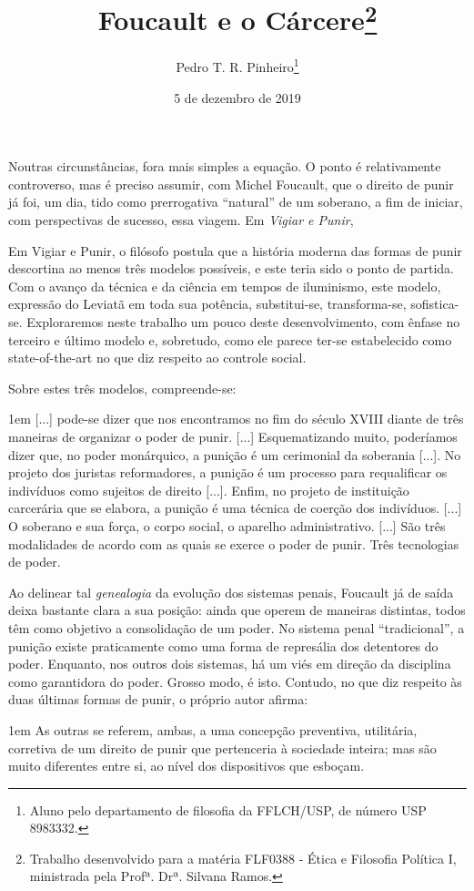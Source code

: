 \documentclass[12pt,a4paper]{article}
\author{Pedro T. R. Pinheiro\footnote{Aluno pelo departamento de filosofia 
da FFLCH/USP, de número USP 8983332. }}
\title{Foucault e o Cárcere\footnote{
	Trabalho desenvolvido para a matéria FLF0388 - Ética e Filosofia 
	Política I, ministrada pela Profª. Drª. Silvana Ramos. }}
\date{5 de dezembro de 2019}
\newenvironment{citac}
{
	\begin{addmargin}
		[4cm]{1em} \footnotesize}{\normalfont 
	\end{addmargin}
}
\begin{document}
	\maketitle
	
	\onehalfspacing
	\setlength{\parskip}{0.5cm}
	
	Noutras circunstâncias, fora mais simples a equação. O ponto é 
	relativamente controverso, mas é preciso assumir, com Michel 
	Foucault, que o direito de punir já foi, um dia, tido como 
	prerrogativa “natural” de um soberano, a fim de iniciar, com 
	perspectivas de sucesso, essa viagem. Em \textit{Vigiar e Punir}, 

	Em Vigiar e Punir, o filósofo postula que a história moderna 
	das formas de punir descortina ao menos três modelos possíveis, 
	e este teria sido o ponto de partida. Com o avanço da técnica e 
	da ciência em tempos de iluminismo, este modelo, expressão do 
	Leviatã em toda sua potência, substitui-se, transforma-se, 
	sofistica-se. Exploraremos neste trabalho um pouco deste desenvolvimento, 
	com ênfase no terceiro e último modelo e, sobretudo, como ele parece 
	ter-se estabelecido como state-of-the-art no que diz respeito ao 
	controle social.
	
	Sobre estes três modelos, compreende-se: 
	
	\begin{citac}
		[...] pode-se dizer que nos encontramos no fim do século XVIII 
		diante de três maneiras de organizar o poder de punir. [...] 
		Esquematizando muito, poderíamos dizer que, no poder 
		monárquico, a punição é um cerimonial da soberania [...]. No 
		projeto dos juristas reformadores, a punição é um processo 
		para requalificar os indivíduos como sujeitos de direito 
		[...]. Enfim, no projeto de instituição carcerária que se 
		elabora, a punição é uma técnica de coerção dos indivíduos. 
		[...] O soberano e sua força, o corpo social, o aparelho 
		administrativo. [...] São três modalidades de acordo com 
		as quais se exerce o poder de punir. Três tecnologias de poder. 
		\cite{foucault}
	\end{citac}

	Ao delinear tal \emph{genealogia} da evolução dos sistemas penais, 
	Foucault já de saída deixa bastante clara a sua posição: ainda que 
	operem de maneiras distintas, todos têm como objetivo a consolidação 
	de um poder. No sistema penal ``tradicional'', a punição existe 
	praticamente como uma forma de represália dos detentores do poder. 
	Enquanto, nos outros dois sistemas, há um viés em direção da 
	disciplina como garantidora do poder. Grosso modo, é isto. Contudo, 
	no que diz respeito às duas últimas formas de punir, o 
	próprio autor afirma: 
	\begin{citac}
		As outras se referem, ambas, a uma concepção preventiva, 
		utilitária, corretiva de um direito de punir que pertenceria 
		à sociedade inteira; mas são muito diferentes entre si, ao 
		nível dos dispositivos que esboçam. \cite{foucault}
	\end{citac}
\end{document}
